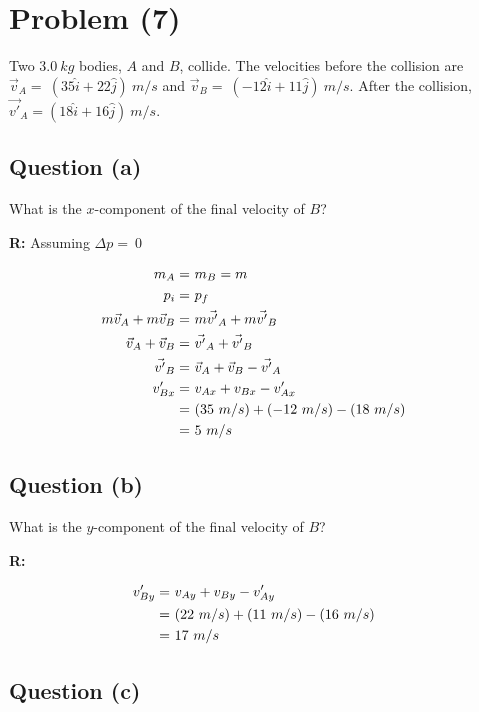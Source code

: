 \section{Problem (7)}
	Two $3.0 \ kg$ bodies, $A$ and $B$, collide. The velocities before the collision are $\vec{v}_{A} = \ (35 \hat{i} + 22 \hat{j}) \ m/s$ and $\vec{v}_{B} = \ (-12 \hat{i} + 11 \hat{j}) \ m/s$. After the collision, $\vec{v'}_{A} = (18 \hat{i} + 16 \hat{j}) \ m/s$.

	\subsection{Question (a)}

		What is the $x$-component of the final velocity of $B$?

		\textbf{R:} Assuming $\Delta p = \ 0$

		\begin{align}
			m_{A} = \ &m_{B} = m& \notag \\
			p_{i} = \ &p_{f}& \notag \\
			m\vec{v}_{A} + m\vec{v}_{B} = \ &m\vec{v'}_{A} + m\vec{v'}_{B}& \notag \\
			\vec{v}_{A} + \vec{v}_{B} = \ &\vec{v'}_{A} + \vec{v'}_{B}& \notag \\
			\vec{v'}_{B} = \ &\vec{v}_{A} + \vec{v}_{B} - \vec{v'}_{A}& \notag \\
			v'_{Bx} = \ &v_{Ax} + v_{Bx} - v'_{Ax}& \notag \\
			= \ &(35 \ m/s) + (-12 \ m/s) - (18 \ m/s)& \notag \\
			= \ &5 \ m/s&
		\end{align}

	\subsection{Question (b)}

		What is the $y$-component of the final velocity of $B$?

		\textbf{R:}

		\begin{align}
			v'_{By} = \ &v_{Ay} + v_{By} - v'_{Ay}& \notag \\
			= \ &(22 \ m/s) + (11 \ m/s) - (16 \ m/s)& \notag \\
			= \ &17 \ m/s&
		\end{align}

	\subsection{Question (c)}

